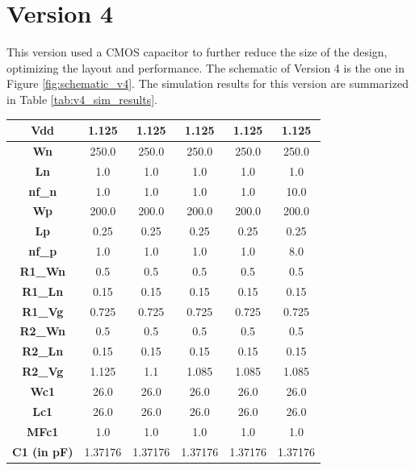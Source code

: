 \section{Version 4}
This version used a CMOS capacitor to further reduce the size of the design, optimizing the layout and performance.
The schematic of Version 4 is the one in Figure \ref{fig:schematic_v4}.
The simulation results for this version are summarized in Table \ref{tab:v4_sim_results}.

\begin{table}[!ht]
    \centering
    \begin{adjustbox}{max width=\linewidth}
    \begin{tabular}{|c|c|c|c|c|c|}
    \hline
        \textbf{Vdd} & 1.125 & 1.125 & 1.125 & 1.125 & 1.125 \\ \hline
        \textbf{Wn} & 250.0 & 250.0 & 250.0 & 250.0 & 250.0 \\ \hline
        \textbf{Ln} & 1.0 & 1.0 & 1.0 & 1.0 & 1.0 \\ \hline
        \textbf{nf\_n} & 1.0 & 1.0 & 1.0 & 1.0 & 10.0 \\ \hline
        \textbf{Wp} & 200.0 & 200.0 & 200.0 & 200.0 & 200.0 \\ \hline
        \textbf{Lp} & 0.25 & 0.25 & 0.25 & 0.25 & 0.25 \\ \hline
        \textbf{nf\_p} & 1.0 & 1.0 & 1.0 & 1.0 & 8.0 \\ \hline
        \textbf{R1\_Wn} & 0.5 & 0.5 & 0.5 & 0.5 & 0.5 \\ \hline
        \textbf{R1\_Ln} & 0.15 & 0.15 & 0.15 & 0.15 & 0.15 \\ \hline
        \textbf{R1\_Vg} & 0.725 & 0.725 & 0.725 & 0.725 & 0.725 \\ \hline
        \textbf{R2\_Wn} & 0.5 & 0.5 & 0.5 & 0.5 & 0.5 \\ \hline
        \textbf{R2\_Ln} & 0.15 & 0.15 & 0.15 & 0.15 & 0.15 \\ \hline
        \textbf{R2\_Vg} & 1.125 & 1.1 & 1.085 & 1.085 & 1.085 \\ \hline
        \textbf{Wc1} & 26.0 & 26.0 & 26.0 & 26.0 & 26.0 \\ \hline
        \textbf{Lc1} & 26.0 & 26.0 & 26.0 & 26.0 & 26.0 \\ \hline
        \textbf{MFc1} & 1.0 & 1.0 & 1.0 & 1.0 & 1.0 \\ \hline
        \textbf{C1 (in pF)} & 1.37176 & 1.37176 & 1.37176 & 1.37176 & 1.37176 \\ \hline

\end{tabular}
\end{adjustbox}
\end{table}
